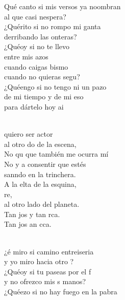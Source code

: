 \begin{cancion}%
	Qué canto si mis versos ya noombran\\
	al que casi nespera?\\
	¿Quérito si no rompo mi ganta \\
	derribando las onteras?\\
	¿Quéoy si no te llevo  \\
	entre mis azos\\
	cuando caigas bismo\\
	cuando no quieras segu?\\
	¿Quéengo si no tengo ni un pazo \\
	de mi tiempo y de mi eso\\
	para dártelo hoy ai\\\jump\\
	\begin{chorus}%
	 quiero ser actor\\
	al otro do de la escena,\\
	No qu que también me ocurra mí\\
	No y a consentir que estés \\
	sanndo en la trinchera.\\
	A la elta de la esquina,\\
        re,\\
al otro lado del planeta.\\
	Tan jos y tan rca.\\
	Tan jos an cca.\\
	\end{chorus}%
	\jump\\
	¿é miro si camino entreiseria \\
	y yo miro hacia otro ?\\
	¿Quéoy si tu paseas por el f \\
	y no ofrezco mis s manos?\\
	¿Quéezo si no hay fuego en la pabra \\

\end{cancion}
